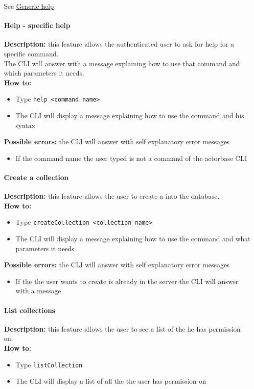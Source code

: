 \documentclass{scalatekids-article}
\begin{document}
See \hyperref[sec:generichelp]{Generic help}

\paragraph{Help - specific help}
\label{sec:specifichelp}
\textbf{Description:} this feature allows the authenticated user to ask for help for
a specific command.\\
The CLI will answer with a message explaining how to use that command and
which parameters it needs.\\
\textbf{How to:}
\begin{itemize}
\item Type \texttt{help <command name>}
\item The CLI will display a message explaining how to use the command and his syntax
\end{itemize}
\textbf{Possible errors:} the CLI will answer with self explanatory error messages
\begin{itemize}
\item If the command name the user typed is not a command of the actorbase CLI
\end{itemize}

\paragraph{Create a collection}
\label{sec:createcollection}
\textbf{Description:} this feature allows the user to create a
 into the database.\\
\textbf{How to:}
\begin{itemize}
\item Type \texttt{createCollection <collection name>}
\item The CLI will display a message explaining how to use the command and what parameters it needs
\end{itemize}
\textbf{Possible errors:} the CLI will answer with self explanatory error messages
\begin{itemize}
\item If the  the user wants to create is already in the server the CLI will answer with a message
\end{itemize}

\paragraph{List collections}
\label{sec:listcollection}
\textbf{Description:} this feature allows the user to see a list of
the  he has permission on.\\
\textbf{How to:}
\begin{itemize}
\item Type \texttt{listCollection}
\item The CLI will display a list of all the  the user has
  permission on
\end{itemize}
\end{document}

